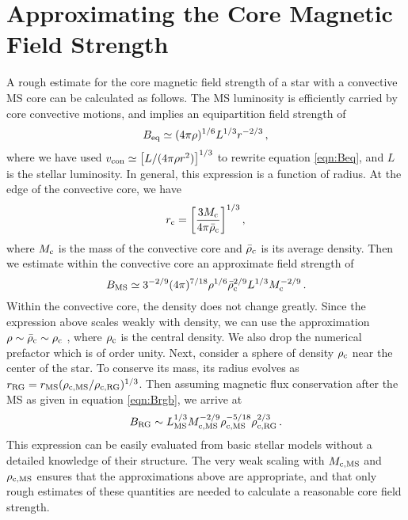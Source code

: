 \section{Approximating the Core Magnetic Field Strength}
\label{Bcenap}

A rough estimate for the core magnetic field strength of a star with a convective MS core can be calculated as follows. The MS luminosity is efficiently carried by core convective motions, and implies an equipartition field strength of 
\begin{equation}
\label{eqn:Beq2}
B_{\rm eq} \simeq (4 \pi \rho)^{1/6} L^{1/3} r^{-2/3} \, ,
\end{equation}
where we have used $v_{\rm con} \simeq \big[L/(4 \pi \rho r^2)\big]^{1/3}$ to rewrite equation \ref{eqn:Beq}, and $L$ is the stellar luminosity. In general, this expression is a function of radius. At the edge of the convective core, we have
\begin{equation}
\label{eqn:rc}
r_{\rm c} = \bigg[ \frac{3 M_{\rm c}}{4 \pi {\bar \rho}_{\rm c}} \bigg]^{1/3} \, ,
\end{equation}
where $M_{\rm c}$ is the mass of the convective core and ${\bar \rho}_{\rm c}$ is its average density. Then we estimate within the convective core an approximate field strength of
\begin{equation}
\label{eqn:Beq3}
B_{\rm MS} \simeq 3^{-2/9} (4 \pi)^{7/18} \rho^{1/6} {\bar \rho}_{\rm c}^{2/9} L^{1/3} M_{\rm c}^{-2/9} \, .
\end{equation}
Within the convective core, the density does not change greatly. Since the expression above scales weakly with density, we can use the approximation $\rho \sim {\bar \rho}_{\rm c} \sim \rho_{\rm c}$ , where $\rho_{\rm c}$ is the central density. We also drop the numerical prefactor which is of order unity. Next, consider a sphere of density $\rho_{\rm c}$ near the center of the star. To conserve its mass, its radius evolves as $r_{\rm RG} = r_{\rm MS} (\rho_{\rm c,MS}/\rho_{\rm c,RG})^{1/3}$. Then assuming magnetic flux conservation after the MS as given in equation \ref{eqn:Brgb}, we arrive at 
\begin{equation}
\label{eqn:Bcen2}
B_{\rm RG} \sim L_{\rm MS}^{1/3} M_{\rm c,MS}^{-2/9} \rho_{\rm c,MS}^{-5/18} \rho_{\rm c,RG}^{2/3} \, .
\end{equation}
This expression can be easily evaluated from basic stellar models without a detailed knowledge of their structure. The very weak scaling with $M_{\rm c,MS}$ and $\rho_{\rm c,MS}$ ensures that the approximations above are appropriate, and that only rough estimates of these quantities are needed to calculate a reasonable core field strength.
